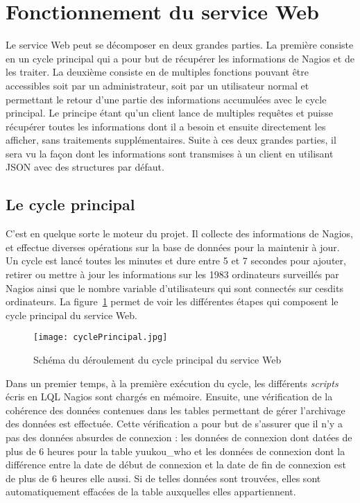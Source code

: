 \section{Fonctionnement du service Web}

Le service Web peut se d\'ecomposer en deux grandes parties.
La premi\`ere consiste en un cycle principal qui a pour but de r\'ecup\'erer les informations de Nagios et de les traiter.
La deuxi\`eme consiste en de multiples fonctions pouvant \^etre accessibles soit par un administrateur, soit par un utilisateur normal et permettant le retour d'une partie des informations accumul\'ees avec le cycle principal.
Le principe \'etant qu'un client lance de multiples requ\^etes et puisse r\'ecup\'erer toutes les informations dont il a besoin et ensuite directement les afficher, sans traitements suppl\'ementaires.
Suite \`a ces deux grandes parties, il sera vu la fa\c{c}on dont les informations sont transmises \`a un client en utilisant JSON avec des structures par d\'efaut.

\subsection{Le cycle principal}
\label{section:cyclePrincipal}

C'est en quelque sorte le moteur du projet.
Il collecte des informations de Nagios, et effectue diverses op\'erations sur la base de donn\'ees pour la maintenir \`a jour.
Un cycle est lanc\'e toutes les minutes et dure entre 5 et 7 secondes pour ajouter, retirer ou mettre \`a jour les informations sur les 1983 ordinateurs surveill\'es par Nagios ainsi que le nombre variable d'utilisateurs qui sont connect\'es sur cesdits ordinateurs.
La figure~\ref{figure:cyclePrincipal} permet de voir les diff\'erentes \'etapes qui composent le cycle principal du service Web.

\begin{figure}[!ht]
	\centering
	\texttt{[image: cyclePrincipal.jpg]}
	\caption{Sch\'ema du d\'eroulement du cycle principal du service Web}
	\label{figure:cyclePrincipal}
	
\end{figure}

Dans un premier temps, \`a la premi\`ere ex\'ecution du cycle, les diff\'erents \textit{scripts} \'ecris en LQL Nagios sont charg\'es en m\'emoire.
Ensuite, une v\'erification de la coh\'erence des donn\'ees contenues dans les tables permettant de g\'erer l'archivage des donn\'ees est effectu\'ee.
Cette v\'erification a pour but de s'assurer que il n'y a pas des donn\'ees absurdes de connexion : les donn\'ees de connexion dont dat\'ees de plus de 6 heures pour la table \textsf{yuukou\_who} et les donn\'ees de connexion dont la diff\'erence entre la date de d\'ebut de connexion et la date de fin de connexion est de plus de 6 heures elle aussi.
Si de telles donn\'ees sont trouv\'ees, elles sont automatiquement effac\'ees de la table auxquelles elles appartiennent.

